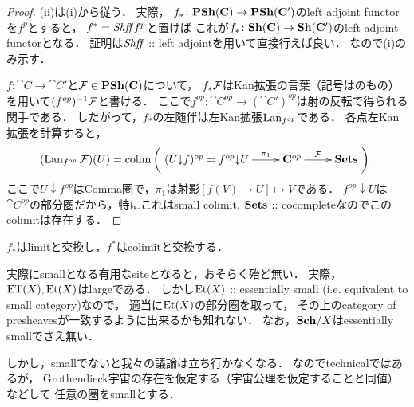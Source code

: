 \documentclass[a4paper, dvipdfmx]{jsarticle}
\begin{document}
\begin{proof}
    (ii)は(i)から従う．
    実際，
    $f_* \colon \mathbf{PSh}(\mathbf{C}) \to \mathbf{PSh}(\mathbf{C}')$のleft adjoint functorを$f^p$とすると，
    $f^*=\mathit{Shff} f^p$と置けば
    これが$f_* \colon \mathbf{Sh}(\mathbf{C}) \to \mathbf{Sh}(\mathbf{C}')$のleft adjoint functorとなる．
    証明は$\mathit{Shff}$ :: left adjointを用いて直接行えば良い．
    なので(i)のみ示す．

    $f \colon \cat{C} \to \cat{C}'$と$\mathcal{F} \in \mathbf{PSh}(\mathbf{C})$について，
    $f_* \mathcal{F}$はKan拡張の言葉（記号は\cite{CWM}のもの）を用いて$(f^{op})^{-1} \mathcal{F}$と書ける．
    ここで$f^{op} \colon \cat{C}^{op} \to (\cat{C}')^{op}$は射の反転で得られる関手である．
    したがって，$f_*$の左随伴は左Kan拡張$\operatorname{Lan}_{f^{op}}$である．
    各点左Kan拡張を計算すると，
    \[ (\Lan_{f^{op}}\shF)(U)=\Colim\left(\xymatrix{
        (\Comma{U}{f})^{op}=\Comma{f^{op}}{U} \ar[r]^-{\pi_1}& \cat{C}^{op} \ar[r]^-{\shF}& \Sets
    }\right). \]
    ここで$U \downarrow f^{op}$はComma圏で，$\pi_1$は射影$[f(V) \to U] \mapsto V$である．
    $f^{op} \downarrow U$は$\cat{C}^{op}$の部分圏だから，特にこれはsmall colimit.
    $\mathbf{Sets}$ :: cocompleteなのでこのcolimitは存在する．
\end{proof}

\begin{Cor}
    $f_*$はlimitと交換し，$f^*$はcolimitと交換する．
\end{Cor}


\begin{Remark}
    実際にsmallとなる有用なsiteとなると，おそらく殆ど無い．
    実際，$\mathrm{ET}(X), \mathrm{Et}(X)$はlargeである．
    しかし$\mathrm{Et}(X)$ :: essentially small (i.e. equivalent to small category)なので，
    適当に$\mathrm{Et}(X)$の部分圏を取って，
    その上のcategory of presheavesが一致するように出来るかも知れない．
    なお，$\mathbf{Sch}/X$はessentially smallでさえ無い．

    しかし，smallでないと我々の議論は立ち行かなくなる．
    なのでtechnicalではあるが，
    Grothendieck宇宙の存在を仮定する（宇宙公理を仮定することと同値）などして
    任意の圏をsmallとする．
\end{Remark}



\end{document}
